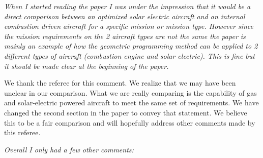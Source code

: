 \documentclass[10pt, a4paper]{article}
\begin{document}
\emph{When I started reading the paper I was under the impression that it would be a direct comparison between an optimized solar electric aircraft and an internal combustion driven aircraft for a specific mission or mission type. However since the mission requirements on the 2 aircraft types are not the same the paper is mainly an example of how the geometric programming method can be applied to 2 different types of aircraft (combustion engine and solar electric). This is fine but it should be made clear at the beginning of the paper.}

    We thank the referee for this comment.  We realize that we may have been unclear in our comparison.  What we are really comparing is the capability of gas and solar-electric powered aircraft to meet the same set of requirements.  We have changed the second section in the paper to convey that statement.  We believe this to be a fair comparison and will hopefully address other comments made by this referee. 

\emph{Overall I only had a few other comments:}
\end{document}
